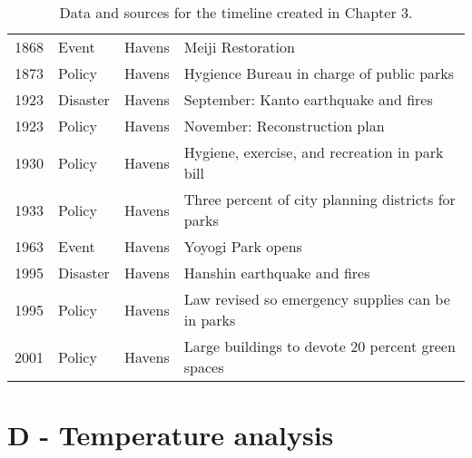 \begin{table}[htbp]
\begin{adjustwidth}{-1in}{-1in}
\begin{tabular}{llll}
1868 &     Event &   Havens & Meiji Restoration \\
1873 &    Policy &   Havens & Hygience Bureau in charge of public parks \\
1923 &  Disaster &   Havens & September: Kanto earthquake and fires \\
1923 &    Policy &   Havens & November: Reconstruction plan \\
1930 &    Policy &   Havens & Hygiene, exercise, and recreation in park bill \\
1933 &    Policy &   Havens &  Three percent of city planning districts for parks \\
1963 &     Event &   Havens &  Yoyogi Park opens \\
1995 &  Disaster &   Havens &  Hanshin earthquake and fires \\
1995 &    Policy &   Havens &  Law revised so emergency supplies can be in parks \\
2001 &    Policy &   Havens &  Large buildings to devote 20 percent green spaces \\
\bottomrule
\end{tabular}
\caption[Historical timeline data]{Data and sources for the timeline created in Chapter 3.}
\label{table:timeline_data}
\end{adjustwidth}
\end{table}




\chapter*{D - Temperature analysis}

\renewcommand{\thefigure}{D.\arabic{figure}}
\setcounter{figure}{0}
\renewcommand{\thetable}{D.\arabic{table}}
\setcounter{table}{0}

